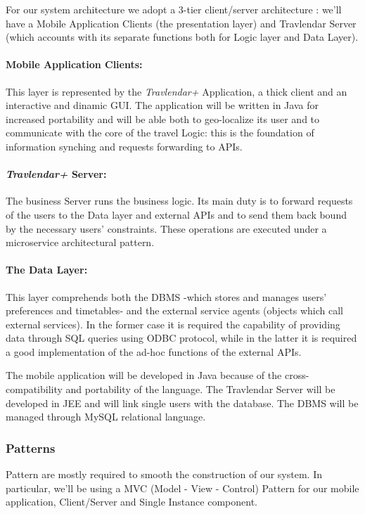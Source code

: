 For our system architecture we adopt a 3-tier client/server architecture : we'll have a Mobile Application Clients (the presentation layer) and Travlendar Server (which accounts with its separate functions both for Logic layer and Data Layer).


\paragraph{Mobile Application Clients:} This layer is represented by the \textit{Travlendar+} Application, a thick client and an interactive and dinamic GUI.
The application will be written in Java for increased portability and will be able both to geo-localize its user and to communicate with the core of the travel Logic: this is the foundation of information synching and requests forwarding to APIs.

\paragraph{\textit{Travlendar+} Server:} The business Server runs the business logic. Its main duty is to forward requests of the users to the Data layer and external APIs and to send them back bound by the necessary users' constraints. These operations are executed under a microservice architectural pattern.

\paragraph{The Data Layer:} This layer comprehends both the DBMS -which stores and manages users' preferences and timetables- and the external service agents (objects which call external services). In the former case it is required the capability of providing data through SQL queries using ODBC protocol, while in the latter it is required a good implementation of the ad-hoc functions of the external APIs.

The mobile application will be developed in Java because of the cross-compatibility and portability of the language.
The Travlendar Server will be developed in JEE and will link single users with the database.
The DBMS will be managed through MySQL relational language.

\subsubsection*{Patterns} 

Pattern are mostly required to smooth the construction of our system. In particular, we'll be using a MVC (Model - View - Control) Pattern for our mobile application, Client/Server and Single Instance component.

